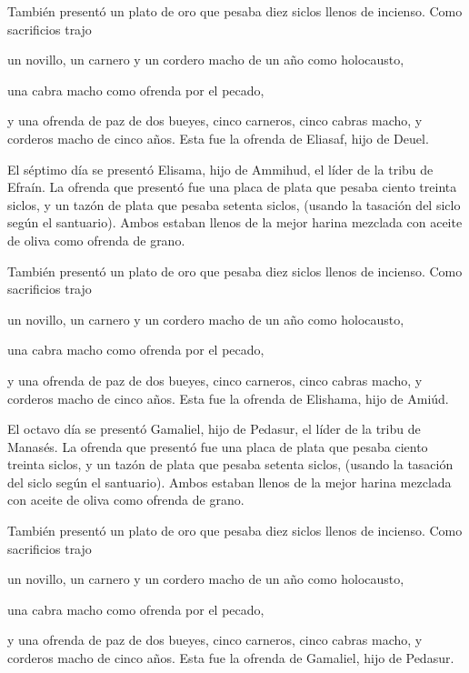  También presentó un plato de oro que pesaba diez siclos
llenos de incienso. Como sacrificios trajo

 un novillo, un carnero y un cordero macho de un año como
holocausto,

 una cabra macho como ofrenda por el pecado,

 y una ofrenda de paz de dos bueyes, cinco carneros,
cinco cabras macho, y corderos macho de cinco años. Esta fue la ofrenda
de Eliasaf, hijo de Deuel.

 El séptimo día se presentó Elisama, hijo de Ammihud, el
líder de la tribu de Efraín.  La ofrenda que presentó fue
una placa de plata que pesaba ciento treinta siclos, y un tazón de plata
que pesaba setenta siclos, (usando la tasación del siclo según el
santuario). Ambos estaban llenos de la mejor harina mezclada con aceite
de oliva como ofrenda de grano.

 También presentó un plato de oro que pesaba diez siclos
llenos de incienso. Como sacrificios trajo

 un novillo, un carnero y un cordero macho de un año como
holocausto,

 una cabra macho como ofrenda por el pecado,

 y una ofrenda de paz de dos bueyes, cinco carneros,
cinco cabras macho, y corderos macho de cinco años. Esta fue la ofrenda
de Elishama, hijo de Amiúd.

 El octavo día se presentó Gamaliel, hijo de Pedasur, el
líder de la tribu de Manasés.  La ofrenda que presentó
fue una placa de plata que pesaba ciento treinta siclos, y un tazón de
plata que pesaba setenta siclos, (usando la tasación del siclo según el
santuario). Ambos estaban llenos de la mejor harina mezclada con aceite
de oliva como ofrenda de grano.

 También presentó un plato de oro que pesaba diez siclos
llenos de incienso. Como sacrificios trajo

 un novillo, un carnero y un cordero macho de un año como
holocausto,

 una cabra macho como ofrenda por el pecado,

 y una ofrenda de paz de dos bueyes, cinco carneros,
cinco cabras macho, y corderos macho de cinco años. Esta fue la ofrenda
de Gamaliel, hijo de Pedasur.

